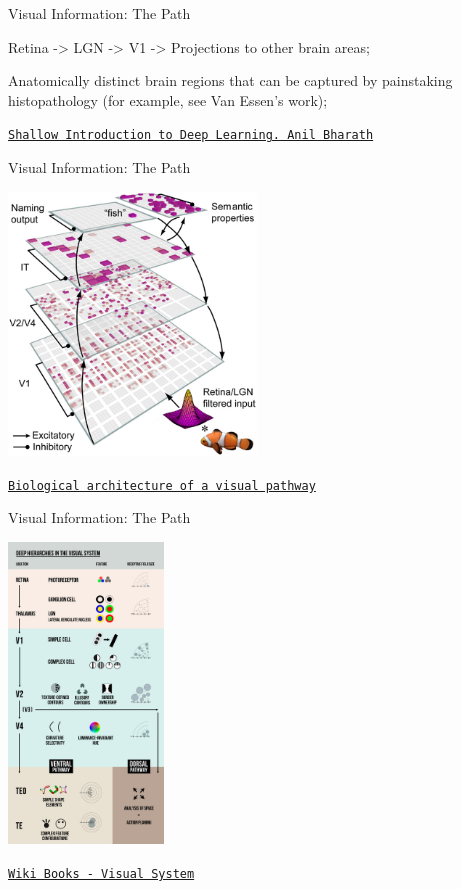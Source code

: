 \documentclass[12pt,t]{beamer}
\begin{document}
\begin{frame}[c]{Visual Information: The Path}

Retina -> LGN -> V1 -> Projections to other brain areas;

Anatomically distinct brain regions that can be captured by painstaking histopathology (for example, see Van Essen’s work);

\hfill
{\footnotesize \lolit
\href{http://bicv.org/downloads/Shallow_Introduction_to_Deep_Learning-Jan_30_2014.pdf}{\tt Shallow Introduction to Deep Learning. Anil Bharath}
}

\end{frame}

\begin{frame}[c]{Visual Information: The Path}

\includegraphics[height=70mm]{Figs/biological_visual_pathway.jpg}

\hfill
{\footnotesize \lolit
\href{http://journal.frontiersin.org/article/10.3389/fpsyg.2013.00124/full}{\tt Biological architecture of a visual pathway}
}

\end{frame}

\begin{frame}[c]{Visual Information: The Path}

\includegraphics[height=80mm]{Figs/visual_system_hierarchies.png}

\hfill
{\footnotesize \lolit
\href{https://en.wikibooks.org/wiki/Sensory_Systems/Visual_System}{\tt Wiki Books - Visual System}
}

\end{frame}
\end{document}
